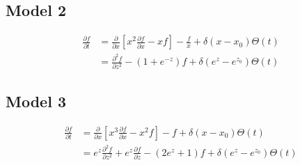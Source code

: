 \documentclass{article}
\begin{document}
\subsection{Model 2}
    \begin{equation}
        \begin{split}
            \frac{\partial f} {\partial t} &= \frac{\partial}{\partial x}
            \left[x^2 \frac{\partial f}{\partial x} - xf\right]
             - \frac{f}{x}
             + \delta(x-x_0)\Theta(t) \\
            &= \frac{\partial^2 f}{\partial z^2}
            - \left(1+e^{-z}\right) f
            + \delta(e^{z}-e^{z_0})\Theta(t)
        \end{split}
    \end{equation}

\subsection{Model 3}
    \begin{equation}
        \begin{split}
            \frac{\partial f} {\partial t} &= \frac{\partial}{\partial x}
            \left[x^3 \frac{\partial f}{\partial x} - x^2f\right]
             - f
             + \delta(x-x_0)\Theta(t) \\
            &= e^{z}\frac{\partial^2 f}{\partial z^2}
            +  e^{z} \frac{\partial f}{\partial z}
            - \left(2e^z+1\right) f
            + \delta(e^{z}-e^{z_0})\Theta(t)
        \end{split}
    \end{equation}
\end{document}
